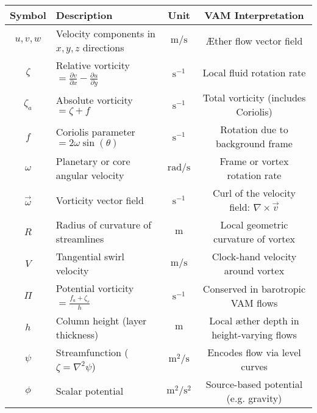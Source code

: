 \documentclass[12pt]{article}
\begin{document}
    \begin{table}[H]
        \centering
        \footnotesize
        \renewcommand{\arraystretch}{1.4}
        \begin{tabular}{|c|l|c|c|}
            \hline
            \textbf{Symbol} & \textbf{Description} & \textbf{Unit} & \textbf{VAM Interpretation} \\
            \hline
            $u, v, w$      & Velocity components in $x, y, z$ directions & $\mathrm{m/s}$ & Æther flow vector field \\
            \hline
            $\zeta$        & Relative vorticity $= \frac{\partial v}{\partial x} - \frac{\partial u}{\partial y}$ & $\mathrm{s}^{-1}$ & Local fluid rotation rate \\
            \hline
            $\zeta_a$      & Absolute vorticity $= \zeta + f$ & $\mathrm{s}^{-1}$ & Total vorticity (includes Coriolis) \\
            \hline
            $f$            & Coriolis parameter $= 2\omega \sin(\theta)$ & $\mathrm{s}^{-1}$ & Rotation due to background frame \\
            \hline
            $\omega$       & Planetary or core angular velocity & $\mathrm{rad/s}$ & Frame or vortex rotation rate \\
            \hline
            $\vec{\omega}$ & Vorticity vector field & $\mathrm{s}^{-1}$ & Curl of the velocity field: $\nabla \times \vec{v}$ \\
            \hline
            $R$            & Radius of curvature of streamlines & $\mathrm{m}$ & Local geometric curvature of vortex \\
            \hline
            $V$            & Tangential swirl velocity & $\mathrm{m/s}$ & Clock-hand velocity around vortex \\
            \hline
            $\Pi$          & Potential vorticity $= \frac{f_a + \zeta_r}{h}$ & $\mathrm{s}^{-1}$ & Conserved in barotropic VAM flows \\
            \hline
            $h$            & Column height (layer thickness) & $\mathrm{m}$ & Local æther depth in height-varying flows \\
            \hline
            $\psi$         & Streamfunction ($\zeta = \nabla^2 \psi$) & $\mathrm{m^2/s}$ & Encodes flow via level curves \\
            \hline
            $\phi$         & Scalar potential & $\mathrm{m^2/s^2}$ & Source-based potential (e.g. gravity) \\
            \hline

\end{tabular}
\end{table}
\end{document}
